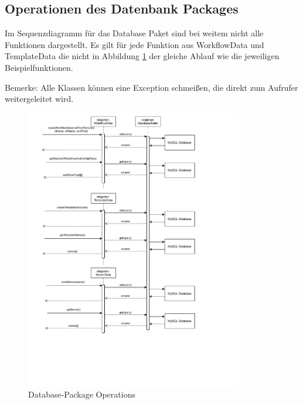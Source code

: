 \subsection{Operationen des Datenbank Packages}
Im Sequenzdiagramm für das Database Paket sind bei weitem nicht alle Funktionen dargestellt. Es gilt für jede Funktion aus WorkflowData und TemplateData die nicht in Abbildung \ref{fig:databaseSeq} der gleiche Ablauf wie die jeweiligen Beispielfunktionen. 

Bemerke: Alle Klassen können eine Exception schmeißen, die direkt zum Aufrufer weitergeleitet wird.


\begin{figure}[H]
	\centering
	\includegraphics[width=0.85\textwidth]{res/Database_Sequence.drawio.pdf} 
	\caption{Database-Package Operations}
	\label{fig:databaseSeq}
\end{figure}